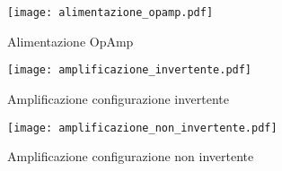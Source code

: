 \begin{figure}
 \centering 
 \texttt{[image: alimentazione\_opamp.pdf]}
 \caption{Alimentazione OpAmp} 
\end{figure}

\begin{figure}
 \centering 
 \texttt{[image: amplificazione\_invertente.pdf]}
 \caption{Amplificazione configurazione invertente} 
\end{figure}

\begin{figure}
 \centering 
 \texttt{[image: amplificazione\_non\_invertente.pdf]}
 \caption{Amplificazione configurazione non invertente} 
\end{figure}
